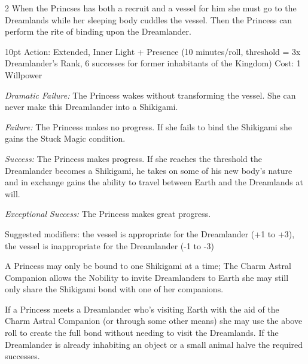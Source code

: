 \begin{multicols}{2}
When the Princses has both a recruit and a vessel for him she must go to the Dreamlands while her sleeping body cuddles the vessel. Then the Princess can perform the rite of binding upon the Dreamlander.

  \begin{myindentpar}{10pt}  Action: Extended, Inner Light + Presence (10 minutes/roll, threshold = 3x Dreamlander's Rank, 6 successes for former inhabitants of the Kingdom) 
    Cost: 1 Willpower 
    
    \emph{Dramatic Failure:} The Princess wakes without transforming the vessel. She can never make this Dreamlander into a Shikigami.
    
    \emph{Failure:} The Princess makes no progress. If she fails to bind the Shikigami she gains the Stuck Magic condition.
    
    \emph{Success:} The Princess makes progress. If she reaches the threshold the Dreamlander becomes a Shikigami, he takes on some of his new body's nature and in exchange gains the ability to travel between Earth and the Dreamlands at will. 
    
    \emph{Exceptional Success:} The Princess makes great progress.
	
    Suggested modifiers: the vessel is appropriate for the Dreamlander (+1 to +3), the vessel is inappropriate for the Dreamlander (-1 to -3) \end{myindentpar}

A Princess may only be bound to one Shikigami at a time; The Charm Astral Companion allows the Nobility to invite Dreamlanders to Earth she may still only share the Shikigami bond with one of her companions. 

If a Princess meets a Dreamlander who's visiting Earth with the aid of the Charm Astral Companion (or through some other means) she may use the above roll to create the full bond without needing to visit the Dreamlands. If the Dreamlander is already inhabiting an object or a small animal halve the required successes. 

\end{multicols}
